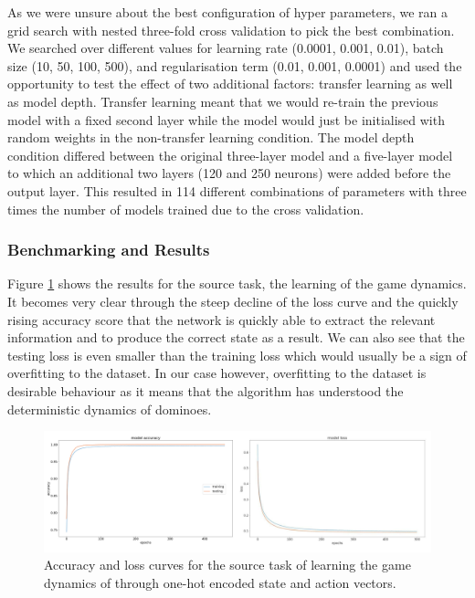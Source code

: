 \documentclass[12pt,a4paper]{article}
\begin{document}
{As we were unsure about the best configuration of hyper parameters, we ran a grid search with nested three-fold cross validation to pick the best combination. We searched over different values for learning rate (0.0001, 0.001, 0.01), batch size (10, 50, 100, 500), and regularisation term (0.01, 0.001, 0.0001) and used the opportunity to test the effect of two additional factors: transfer learning as well as model depth. Transfer learning meant that we would re-train the previous model with a fixed second layer while the model would just be initialised with random weights in the non-transfer learning condition. The model depth condition differed between the original three-layer model and a five-layer model to which an additional two layers (120 and 250 neurons) were added before the output layer. This resulted in 114 different combinations of parameters with three times the number of models trained due to the cross validation.

\subsubsection{Benchmarking and Results}
Figure \ref{fig:src_tsk} shows the results for the source task, the learning of the game dynamics. It becomes very clear through the steep decline of the loss curve and the quickly rising accuracy score that the network is quickly able to extract the relevant information and to produce the correct state as a result. We can also see that the testing loss is even smaller than the training loss which would usually be a sign of overfitting to the dataset. In our case however, overfitting to the dataset is desirable behaviour as it means that the algorithm has understood the deterministic dynamics of dominoes. 

\begin{figure}
  \includegraphics[width=15cm]{img/src_tsk.png}
  \centering 
  \caption{Accuracy and loss curves for the source task of learning the game dynamics of through one-hot encoded state and action vectors.}
  \label{fig:src_tsk}
\end{figure}

}
\end{document}
